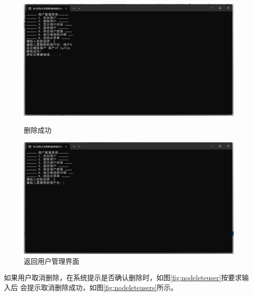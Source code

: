 \documentclass[12pt,twoside]{ctexart}
\begin{document}
\begin{figure}[H]
    \centering
    \begin{minipage}{0.48\textwidth}
        \centering
        \includegraphics[width=\linewidth]{deleteusersucc.png}
        \caption{删除成功}
        \label{fig:DeleteSucc}
    \end{minipage}\hfill
    \begin{minipage}{0.48\textwidth}
        \centering
        \includegraphics[width=\linewidth]{Deleteuser.png}
        \caption{返回用户管理界面}
        \label{fig:DeleteReturn}
    \end{minipage}
\end{figure}

如果用户取消删除，在系统提示是否确认删除时，如图\ref{fig:nodeleteuser}按要求输入后
会提示取消删除成功，如图\ref{fig:nodeleteusers}所示。
\end{document}
